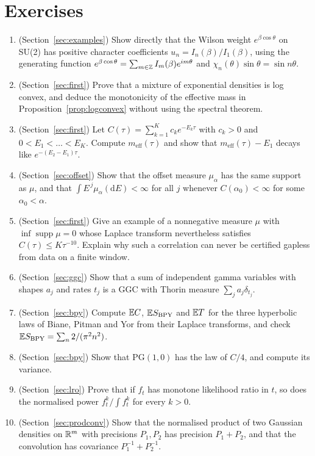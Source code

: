 \section*{Exercises}
\begin{enumerate}
\item (Section~\ref{sec:examples}) Show directly that the Wilson weight $e^{\beta\cos\theta}$ on SU(2) has positive character coefficients $u_n=I_n(\beta)/I_1(\beta)$, using the generating function $e^{\beta\cos\theta}=\sum_{m\in\mathbb{Z}}I_m(\beta)e^{im\theta}$ and $\chi_n(\theta)\sin\theta=\sin n\theta$.
\item (Section~\ref{sec:first}) Prove that a mixture of exponential densities is log convex, and deduce the monotonicity of the effective mass in Proposition~\ref{prop:logconvex} without using the spectral theorem.
\item (Section~\ref{sec:first}) Let $C(\tau)=\sum_{k=1}^Kc_ke^{-E_k\tau}$ with $c_k>0$ and $0<E_1<\dots<E_K$. Compute $m_{\mathrm{eff}}(\tau)$ and show that $m_{\mathrm{eff}}(\tau)-E_1$ decays like $e^{-(E_2-E_1)\tau}$.
\item (Section~\ref{sec:offset}) Show that the offset measure $\mu_\alpha$ has the same support as $\mu$, and that $\int E^{\,j}\mu_\alpha(\mathrm dE)<\infty$ for all $j$ whenever $C(\alpha_0)<\infty$ for some $\alpha_0<\alpha$.
\item (Section~\ref{sec:first}) Give an example of a nonnegative measure $\mu$ with $\inf\operatorname{supp}\mu=0$ whose Laplace transform nevertheless satisfies $C(\tau)\le K\tau^{-10}$. Explain why such a correlation can never be certified gapless from data on a finite window.
\item (Section~\ref{sec:ggc}) Show that a sum of independent gamma variables with shapes $a_j$ and rates $t_j$ is a GGC with Thorin measure $\sum_ja_j\delta_{t_j}$.
\item (Section~\ref{sec:bpy}) Compute $\mathbb{E} C$, $\mathbb{E} S_{\mathrm{BPY}}$ and $\mathbb{E} T$ for the three hyperbolic laws of Biane, Pitman and Yor from their Laplace transforms, and check $\mathbb{E} S_{\mathrm{BPY}}=\sum_n2/(\pi^2n^2)$.
\item (Section~\ref{sec:bpy}) Show that $\mathrm{PG}(1,0)$ has the law of $C/4$, and compute its variance.
\item (Section~\ref{sec:lro}) Prove that if $f_t$ has monotone likelihood ratio in $t$, so does the normalised power $f_t^k/\int f_t^k$ for every $k>0$.
\item (Section~\ref{sec:prodconv}) Show that the normalised product of two Gaussian densities on $\mathbb{R}^m$ with precisions $P_1,P_2$ has precision $P_1+P_2$, and that the convolution has covariance $P_1^{-1}+P_2^{-1}$.
\end{enumerate}
